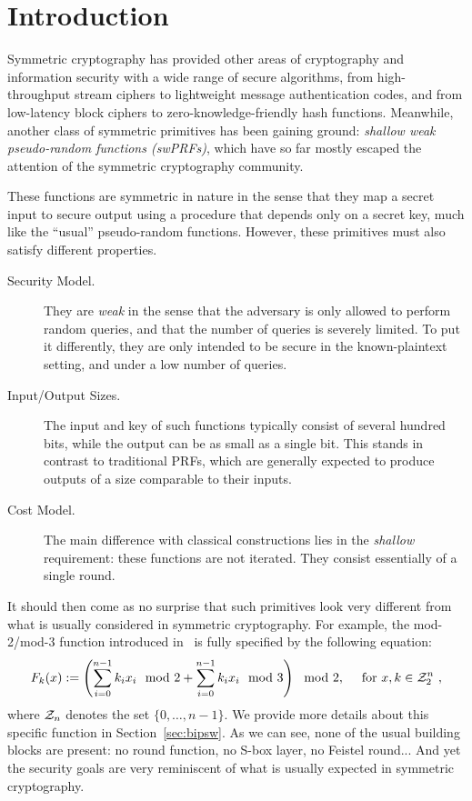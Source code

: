 
\section{Introduction}
\label{sec:intro}

Symmetric cryptography has provided other areas of cryptography and information security with a wide range of secure algorithms, from high-throughput stream ciphers to lightweight message authentication codes, and from low-latency block ciphers to zero-knowledge-friendly hash functions. Meanwhile,  another class of symmetric primitives has been gaining ground: \emph{shallow weak pseudo-random functions (swPRFs)}, which have so far mostly escaped the attention of the symmetric cryptography community. 


These functions are symmetric in nature in the sense that they map a secret input to secure output using a procedure that depends only on a secret key, much like the ``usual'' pseudo-random functions. However, these primitives must also satisfy different properties.
\begin{description}
\item[Security Model.] They are \emph{weak} in the sense that the adversary is only allowed to perform random queries, and that the number of queries is severely limited. To put it differently, they are only intended to be secure in the known-plaintext setting, and under a low number of queries.
\item[Input/Output Sizes.] The input and key of such functions typically consist of several hundred bits, while the output can be as small as a single bit. This stands in contrast to traditional PRFs, which are generally expected to produce outputs of a size comparable to their inputs.
\item[Cost Model.] The main difference with classical constructions lies in the \emph{shallow} requirement: these functions are not iterated. They consist essentially of a single round.
\end{description}
It should then come as no surprise that such primitives look very different from what is usually considered in symmetric cryptography. For example, the mod-2/mod-3 function introduced in~\cite{TCC:BIPSW18} is fully specified by the following equation:
\begin{equation*}
  F_k(x) := \left(\sum_{i = 0}^{n-1} k_i x_i \mod 2 + \sum_{i = 0}^{n-1} k_i x_i \mod 3\right) \mod{2}, \quad \text{ for } x,k \in \mathcal{Z}_2^n~,
\end{equation*}
where $\mathcal{Z}_n$ denotes the set $\{0,\dots,n-1\}$. We provide more details about this specific function in Section~\ref{sec:bipsw}. As we can see, none of the usual building blocks are present: no round function, no S-box layer, no Feistel round... And yet the security goals are very reminiscent of what is usually expected in symmetric cryptography.

